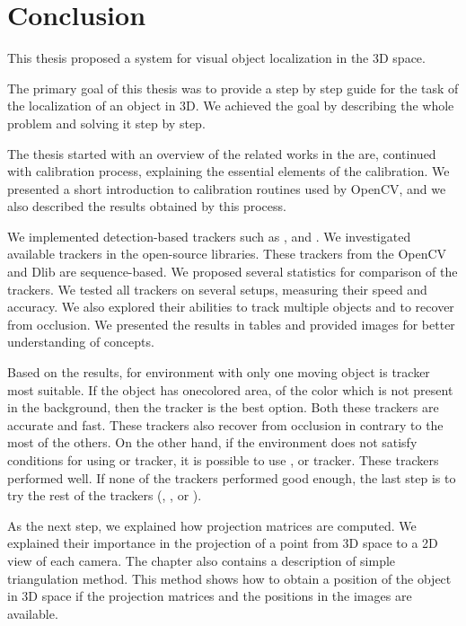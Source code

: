 \chapter*{Conclusion}

This thesis proposed a system for visual object localization in the 3D space.

The primary goal of this thesis was to provide a step by step guide for the task
of the localization of an object in 3D. We achieved the goal by describing
the whole problem and solving it step by step.

\bigskip

The thesis started with an overview of the related works in the are, continued
with calibration process, explaining the essential elements of the calibration.
We presented a short introduction to calibration routines used by OpenCV, and
we also described the results obtained by this process.

We implemented detection-based trackers such as \simback{}, \hsv{} and \patt{}.
We investigated available trackers in the open-source libraries. These trackers
from the OpenCV and Dlib are sequence-based. We proposed several statistics for
comparison of the trackers. We tested all trackers on several setups, measuring
their speed and accuracy. We also explored their abilities to track multiple
objects and to recover from occlusion. We presented the results in
tables and provided images for better understanding of concepts.

Based on the results, for environment with only one moving object is \simback{}
tracker most suitable. If the object has onecolored area, of the color which is
not present in the background, then the \hsv{} tracker is the best option. Both
these trackers are accurate and fast. These trackers also recover from
occlusion in contrary to the most of the others. On the other hand, if the
environment does not satisfy conditions for using \simback{} or \hsv{} tracker,
it is possible to use \medflow{}, \corr{} or \tld{} tracker. These trackers
performed well. If none of the trackers performed good enough, the last step is
to try the rest of the trackers (\mil{}, \boost{}, \mosse{} or \patt{}).


As the next step, we explained how projection matrices are computed. We
explained their importance in the projection of a point from 3D space to a 2D
view of each camera. The chapter also contains a description of simple
triangulation method. This method shows how to obtain a position of the
object in 3D space if the projection matrices and the positions in the images
are available.

